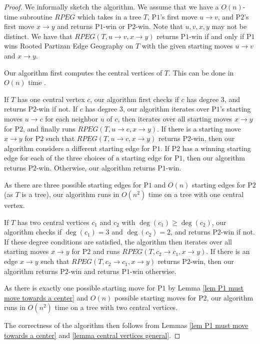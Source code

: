 \documentclass{article}
\theoremstyle{plain}
\theoremstyle{definition}
\def\pone{{\rm{P}\ensuremath{1}}}
\def\ptwo{{\rm{P}\ensuremath{2}}}
\def\poneposs{{\rm{P}\ensuremath{1}'s}}
\def\ptwoposs{{\rm{P}\ensuremath{2}'s}}
\begin{document}
        \begin{proof}
            
            We informally sketch the algorithm.  We assume that we have a $O(n)$-time subroutine $RPEG$ which takes in a tree $T$, \poneposs{} first move $u \to v$, and \ptwoposs{} first move $x \to y$ and returns \pone{}-win or \ptwo{}-win. Note that $u,v,x,y$ may not be distinct. We have that $RPEG(T,u\to v,x\to y)$ returns \pone{}-win if and only if \pone{} wins  {\sc Rooted Partizan Edge Geography} on $T$ with the given starting moves $u\to v$ and $x\to y$. 
            
            Our algorithm first computes the central vertices of $T$.  This can be done in $O(n)$ time \cite{CHH1981}.
            
             If $T$ has one central vertex $c$, our algorithm first checks if $c$ has degree $3$, and returns \ptwo{}-win if not. If $c$ has degree $3$, our algorithm iterates over \poneposs{} starting moves $u \to c$ for each neighbor $u$ of $c$, then iterates over all starting moves $x\to y$ for \ptwo{}, and finally runs $RPEG(T,u\to c, x\to y)$. If there is a starting move $x\to y$ for \ptwo{} such that $RPEG(T,u\to c, x\to y)$ returns \ptwo{}-win, then our algorithm considers a different starting edge for \pone{}. If \ptwo{} has a winning starting edge for each of the three choices of a starting edge for \pone{}, then our algorithm returns \ptwo{}-win. Otherwise, our algorithm returns \pone{}-win. 
            
            As there are three possible starting edges for \pone{} and $O(n)$ starting edges for \ptwo{} (as $T$ is a tree), our algorithm runs in $O(n^2)$ time on a tree with one central vertex. 

            If $T$ has two central vertices $c_1$ and $c_2$ with $\deg(c_1)\geq \deg(c_2)$, our algorithm checks if $\deg(c_1) = 3$ and $\deg(c_2) = 2$, and returns \ptwo{}-win if not. If these degree conditions are satisfied, the algorithm then iterates over all starting moves $x\to y$ for \ptwo{} and runs $RPEG(T,c_2\to c_1, x\to y)$. If there is an edge $x\to y$ such that $RPEG(T, c_2 \to c_1, x \to y)$  returns \ptwo{}-win, then our algorithm returns \ptwo{}-win and returns \pone{}-win otherwise.
            
            As there is exactly one possible starting move for \pone{} by Lemma \ref{lem P1 must move towards a center} and $O(n)$ possible starting moves for \ptwo{}, our algorithm runs in $O(n^2)$ time on a tree with two central vertices. 

            The correctness of the algorithm then follows from  Lemmas \ref{lem P1 must move towards a center} and \ref{lemma central vertices general}. 
        \end{proof}
\end{document}
